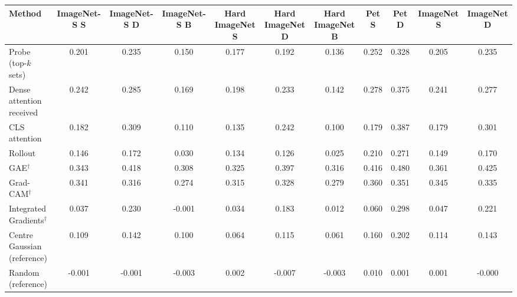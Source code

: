 \begin{tabular}{lcccccccccc}
\toprule
Method & ImageNet-S S & ImageNet-S D & ImageNet-S B & Hard ImageNet S & Hard ImageNet D & Hard ImageNet B & Pet S & Pet D & ImageNet S & ImageNet D \\
\midrule
Probe (top-$k$ sets) & 0.201 & 0.235 & 0.150 & 0.177 & 0.192 & 0.136 & 0.252 & 0.328 & 0.205 & 0.235 \\
Dense attention received & 0.242 & 0.285 & 0.169 & 0.198 & 0.233 & 0.142 & 0.278 & 0.375 & 0.241 & 0.277 \\
CLS attention & 0.182 & 0.309 & 0.110 & 0.135 & 0.242 & 0.100 & 0.179 & 0.387 & 0.179 & 0.301 \\
Rollout & 0.146 & 0.172 & 0.030 & 0.134 & 0.126 & 0.025 & 0.210 & 0.271 & 0.149 & 0.170 \\
GAE$^\dagger$ & 0.343 & 0.418 & 0.308 & 0.325 & 0.397 & 0.316 & 0.416 & 0.480 & 0.361 & 0.425 \\
Grad-CAM$^\dagger$ & 0.341 & 0.316 & 0.274 & 0.315 & 0.328 & 0.279 & 0.360 & 0.351 & 0.345 & 0.335 \\
Integrated Gradients$^\dagger$ & 0.037 & 0.230 & -0.001 & 0.034 & 0.183 & 0.012 & 0.060 & 0.298 & 0.047 & 0.221 \\
Centre Gaussian (reference) & 0.109 & 0.142 & 0.100 & 0.064 & 0.115 & 0.061 & 0.160 & 0.202 & 0.114 & 0.143 \\
Random (reference) & -0.001 & -0.001 & -0.003 & 0.002 & -0.007 & -0.003 & 0.010 & 0.001 & 0.001 & -0.000 \\
\bottomrule
\end{tabular}
